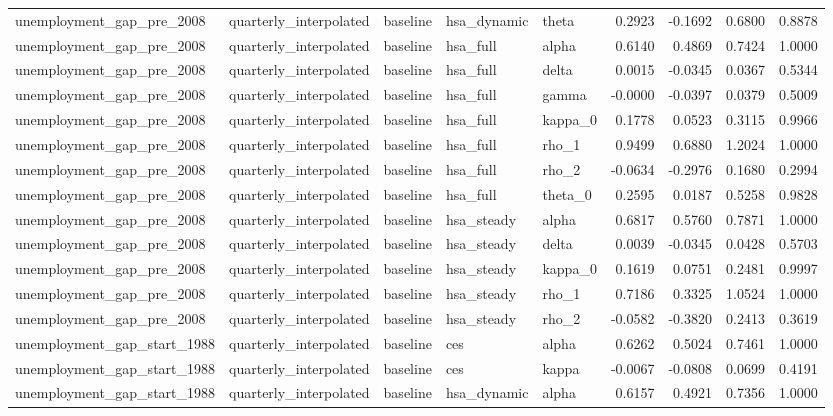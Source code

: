 \begin{tabular}{lllllrrrr}
unemployment\_gap\_pre\_2008 & quarterly\_interpolated & baseline & hsa\_dynamic & theta & 0.2923 & -0.1692 & 0.6800 & 0.8878 \\
unemployment\_gap\_pre\_2008 & quarterly\_interpolated & baseline & hsa\_full & alpha & 0.6140 & 0.4869 & 0.7424 & 1.0000 \\
unemployment\_gap\_pre\_2008 & quarterly\_interpolated & baseline & hsa\_full & delta & 0.0015 & -0.0345 & 0.0367 & 0.5344 \\
unemployment\_gap\_pre\_2008 & quarterly\_interpolated & baseline & hsa\_full & gamma & -0.0000 & -0.0397 & 0.0379 & 0.5009 \\
unemployment\_gap\_pre\_2008 & quarterly\_interpolated & baseline & hsa\_full & kappa\_0 & 0.1778 & 0.0523 & 0.3115 & 0.9966 \\
unemployment\_gap\_pre\_2008 & quarterly\_interpolated & baseline & hsa\_full & rho\_1 & 0.9499 & 0.6880 & 1.2024 & 1.0000 \\
unemployment\_gap\_pre\_2008 & quarterly\_interpolated & baseline & hsa\_full & rho\_2 & -0.0634 & -0.2976 & 0.1680 & 0.2994 \\
unemployment\_gap\_pre\_2008 & quarterly\_interpolated & baseline & hsa\_full & theta\_0 & 0.2595 & 0.0187 & 0.5258 & 0.9828 \\
unemployment\_gap\_pre\_2008 & quarterly\_interpolated & baseline & hsa\_steady & alpha & 0.6817 & 0.5760 & 0.7871 & 1.0000 \\
unemployment\_gap\_pre\_2008 & quarterly\_interpolated & baseline & hsa\_steady & delta & 0.0039 & -0.0345 & 0.0428 & 0.5703 \\
unemployment\_gap\_pre\_2008 & quarterly\_interpolated & baseline & hsa\_steady & kappa\_0 & 0.1619 & 0.0751 & 0.2481 & 0.9997 \\
unemployment\_gap\_pre\_2008 & quarterly\_interpolated & baseline & hsa\_steady & rho\_1 & 0.7186 & 0.3325 & 1.0524 & 1.0000 \\
unemployment\_gap\_pre\_2008 & quarterly\_interpolated & baseline & hsa\_steady & rho\_2 & -0.0582 & -0.3820 & 0.2413 & 0.3619 \\
unemployment\_gap\_start\_1988 & quarterly\_interpolated & baseline & ces & alpha & 0.6262 & 0.5024 & 0.7461 & 1.0000 \\
unemployment\_gap\_start\_1988 & quarterly\_interpolated & baseline & ces & kappa & -0.0067 & -0.0808 & 0.0699 & 0.4191 \\
unemployment\_gap\_start\_1988 & quarterly\_interpolated & baseline & hsa\_dynamic & alpha & 0.6157 & 0.4921 & 0.7356 & 1.0000 \\

\end{tabular}
